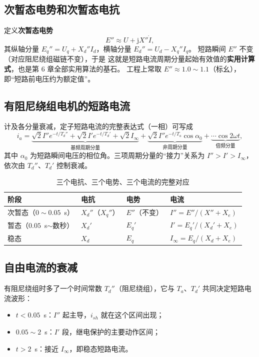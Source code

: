 \subsection{次暂态电势和次暂态电抗}

定义\textbf{次暂态电势}
\begin{equation}
  E''\approx U+\mathrm{j}X''\dot I ,
\end{equation}
其纵轴分量 $E_q''=U_q+X_d''I_d$，横轴分量 $E_d''=U_d-X_q''I_q$。
短路瞬间 $E''$ 不变（对应阻尼绕组磁链不变），于是
这就是短路电流周期分量起始有效值的\textbf{实用计算式}，也是第 6 章全部实用算法的基石。
工程上常取 $E''\approx1.0\sim1.1$（标幺），即“短路前电压约为额定值”。

\subsection{有阻尼绕组电机的短路电流}

计及各分量衰减，定子短路电流的完整表达式（一相）可写成
\begin{equation}
  i_a=\underbrace{\sqrt{2}I''e^{-t/T_d''}+\sqrt{2}I'e^{-t/T_d'}+\sqrt{2}I_\infty}_{\text{基频周期分量}}
  +\underbrace{\sqrt{2}I''e^{-t/T_a}\cos\alpha_0}_{\text{非周期分量}}
  +\underbrace{\cdots\cos 2\omega t}_{\text{倍频分量}} ,
\end{equation}
其中 $\alpha_0$ 为短路瞬间电压的相位角。三项周期分量的“接力”关系为
$I''>I'>I_\infty$，依次由 $T_d''$、$T_d'$ 控制衰减。

\begin{table}[htbp]
  \centering
  \caption{三个电抗、三个电势、三个电流的完整对应}
  \small
  \begin{tabular}{@{}llll@{}}
    \toprule
    阶段 & 电抗 & 电势 & 电流 \\
    \midrule
    次暂态（$0\sim0.05$~s） & $X_d''$（$X_q''$） & $E''$（不变） & $I''=E''/(X''+X_e)$ \\
    暂态（$0.05$~s$\sim$数秒） & $X_d'$ & $E_q'$ & $I'=E_q'/(X_d'+X_e)$ \\
    稳态 & $X_d$ & $E_q$ & $I_\infty=E_q/(X_d+X_e)$ \\
    \bottomrule
  \end{tabular}
\end{table}

\subsection{自由电流的衰减}

有阻尼绕组时多了一个时间常数 $T_d''$（阻尼绕组），它与 $T_a$、$T_d'$ 共同决定短路电流波形：
\begin{itemize}
  \item $t<0.05$~s：$I''$ 起主导，$i_{sh}$ 就在这个区间出现；
  \item $0.05\sim2$~s：$I'$ 段，继电保护的主要动作区间；
  \item $t>2$~s：接近 $I_\infty$，即稳态短路电流。
\end{itemize}

